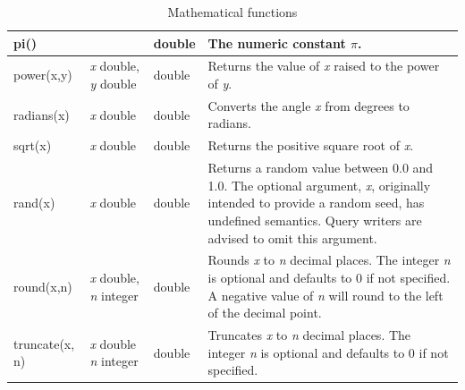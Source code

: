 \documentclass[11pt,a4paper]{ivoa}
\begin{document}
\begin{table}[tpb]
\begin{tabular}{|p{}|p{}|p{}|p{}|}
        \hline
        pi() &
        &
        double &
        The numeric constant \(\pi\).
        \tabularnewline

        \hline
        power(x,y) &
        \textit{x} double,
        \newline
        \textit{y} double &
        double &
        Returns the value of \textit{x} raised to the power of \textit{y}.
        \tabularnewline

        \hline
        radians(x) &
        \textit{x} double &
        double &
        Converts the angle \textit{x} from degrees to radians.
        \tabularnewline

        \hline
        sqrt(x) &
        \textit{x} double &
        double &
        Returns the positive square root of \textit{x}.
        \tabularnewline

        \hline
        rand(x) &
        \textit{x} double &
        double &
        Returns a random value between 0.0 and 1.0.
        The optional argument, \textit{x}, originally intended to provide a random seed,
        has undefined semantics. Query writers are advised to omit this argument.
        \tabularnewline

        \hline
        round(x,n) &
        \textit{x} double,
        \newline
        \textit{n} integer &
        double &
        Rounds \textit{x} to \textit{n} decimal places.
        The integer \textit{n} is optional and defaults to 0 if not specified.
        A negative value of \textit{n} will round to the left of the decimal point.
        \tabularnewline

        \hline
        truncate(x, n) &
        \textit{x} double
        \newline
        \textit{n} integer &
        double &
        Truncates \textit{x} to \textit{n} decimal places.
        The integer \textit{n} is optional and defaults to 0 if not specified.
        \tabularnewline
        \hline
    \end{tabular}
    \caption{Mathematical functions}
    \label{table:math.functions}
\end{table}
\end{document}
